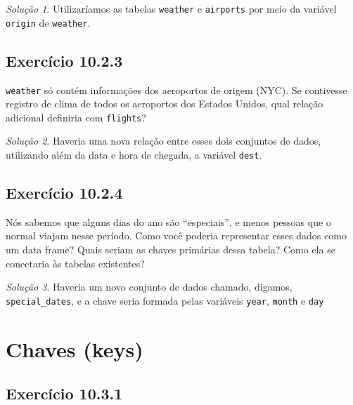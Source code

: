 \documentclass[
]{latex/krantz}
\theoremstyle{definition}
\theoremstyle{definition}
\theoremstyle{definition}
\theoremstyle{definition}
\theoremstyle{remark}
\newtheorem*{solution}{Solução}
\begin{document}
\begin{solution}
Utilizaríamos as tabelas \texttt{weather} e \texttt{airports} por meio da variável \texttt{origin} de \texttt{weather}.
\end{solution}

\hypertarget{exr10-2-3}{%
\subsection*{Exercício 10.2.3}\label{exr10-2-3}}

\texttt{weather} só contém informações dos aeroportos de origem (NYC). Se contivesse registro de clima de todos os aeroportos dos Estados Unidos, qual relação adicional definiria com \texttt{flights}?

\begin{solution}
Haveria uma nova relação entre esses dois conjuntos de dados, utilizando além da data e hora de chegada, a variável \texttt{dest}.
\end{solution}

\hypertarget{exr10-2-4}{%
\subsection*{Exercício 10.2.4}\label{exr10-2-4}}

Nós sabemos que alguns dias do ano são ``especiais'', e menos pessoas que o normal viajam nesse período. Como você poderia representar esses dados como um data frame? Quais seriam as chaves primárias dessa tabela? Como ela se conectaria às tabelas existentes?

\begin{solution}
Haveria um novo conjunto de dados chamado, digamos, \texttt{special\_dates}, e a chave seria formada pelas variáveis \texttt{year}, \texttt{month} e \texttt{day}
\end{solution}

\hypertarget{chaves-keys}{%
\section{Chaves (keys)}\label{chaves-keys}}

\hypertarget{exr10-3-1}{%
\subsection*{Exercício 10.3.1}\label{exr10-3-1}}
\end{document}
